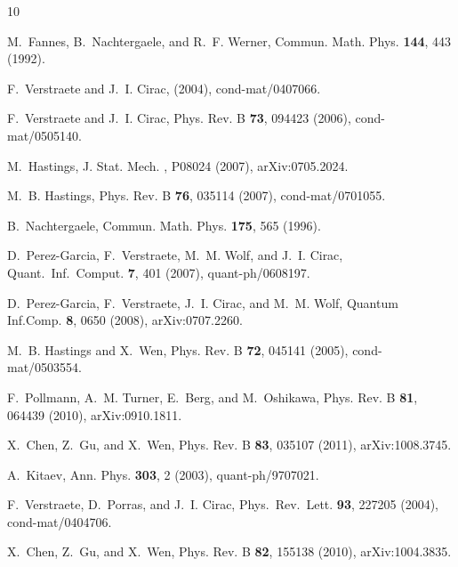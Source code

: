 \documentclass[twocolumn,superscriptaddress,prb,linenumbers]{revtex4-1}
\begin{document}
\begin{thebibliography}{10}

    M.~Fannes, B.~Nachtergaele, and R.~F. Werner,
    \newblock Commun. Math. Phys. {\bf 144}, 443 (1992).

    F.~Verstraete and J.~I. Cirac,
    \newblock (2004), cond-mat/0407066.

    F.~Verstraete and J.~I. Cirac,
    \newblock Phys. Rev. B {\bf 73}, 094423 (2006), cond-mat/0505140.

    M.~Hastings,
    \newblock J. Stat. Mech. , P08024 (2007), arXiv:0705.2024.

    M.~B. Hastings,
    \newblock Phys. Rev. B {\bf 76}, 035114 (2007), cond-mat/0701055.

    B.~Nachtergaele,
    \newblock Commun. Math. Phys. {\bf 175}, 565 (1996).

    D.~Perez-Garcia, F.~Verstraete, M.~M. Wolf, and J.~I. Cirac,
    \newblock Quant.\ Inf.\ Comput. {\bf 7}, 401 (2007), quant-ph/0608197.

    D.~Perez-Garcia, F.~Verstraete, J.~I. Cirac, and M.~M. Wolf,
    \newblock Quantum Inf.Comp. {\bf 8}, 0650 (2008), arXiv:0707.2260.

    M.~B. {Hastings} and X.~{Wen},
    \newblock Phys. Rev. B {\bf 72}, 045141 (2005), cond-mat/0503554.

    F.~{Pollmann}, A.~M. {Turner}, E.~{Berg}, and M.~{Oshikawa},
    \newblock Phys. Rev. B {\bf 81}, 064439 (2010), arXiv:0910.1811.

    X.~{Chen}, Z.~{Gu}, and X.~{Wen},
    \newblock Phys. Rev. B {\bf 83}, 035107 (2011), arXiv:1008.3745.

    A.~Kitaev,
    \newblock Ann. Phys. {\bf 303}, 2 (2003), quant-ph/9707021.

    F.~Verstraete, D.~Porras, and J.~I. Cirac,
    \newblock Phys.\ Rev.\ Lett. {\bf 93}, 227205 (2004), cond-mat/0404706.

    X.~{Chen}, Z.~{Gu}, and X.~{Wen},
    \newblock Phys. Rev. B {\bf 82}, 155138 (2010), arXiv:1004.3835.


\end{thebibliography}
\end{document}
